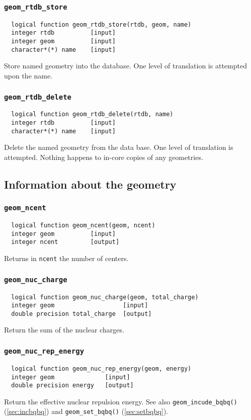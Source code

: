 \subsubsection{{\tt geom\_rtdb\_store}}
\begin{verbatim}
  logical function geom_rtdb_store(rtdb, geom, name)
  integer rtdb          [input]
  integer geom          [input]
  character*(*) name    [input]
\end{verbatim}  
Store named geometry into the database.  One level of translation is
attempted upon the name.

\subsubsection{{\tt geom\_rtdb\_delete}}
\begin{verbatim}
  logical function geom_rtdb_delete(rtdb, name)
  integer rtdb          [input]
  character*(*) name    [input]
\end{verbatim}
Delete the named geometry from the data base.  One level of
translation is attempted.  Nothing happens to in-core copies of any
geometries.

\subsection{Information about the geometry}

\subsubsection{{\tt geom\_ncent}}
\begin{verbatim}
  logical function geom_ncent(geom, ncent)
  integer geom          [input]
  integer ncent         [output]
\end{verbatim}
Returns in {\tt ncent} the number of centers.

\subsubsection{{\tt geom\_nuc\_charge}}
\begin{verbatim}
  logical function geom_nuc_charge(geom, total_charge)
  integer geom                   [input]
  double precision total_charge  [output]
\end{verbatim}
Return the sum of the nuclear charges.

\subsubsection{{\tt geom\_nuc\_rep\_energy}}
\begin{verbatim}
  logical function geom_nuc_rep_energy(geom, energy)
  integer geom              [input]
  double precision energy   [output]
\end{verbatim}
Return the effective nuclear repulsion energy.  See also
\verb+geom_incude_bqbq()+ (\ref{sec:incbqbq}) and
\verb+geom_set_bqbq()+ (\ref{sec:setbqbq}).

